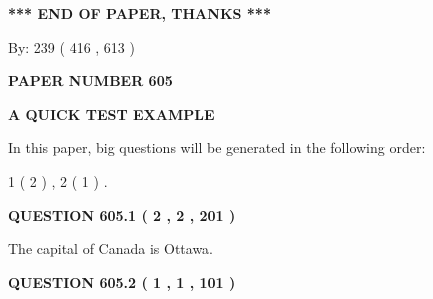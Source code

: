 \documentclass[12pt]{article}
\begin{document}
 
   
   
 \vspace{0.2in}
 
   
   
   
   
\vspace{1.0in} 
{\textbf{\large{ *** END OF PAPER, THANKS *** }}} 
   
   
\hspace{1.0in} By: 
 239 ( 416 ,  613 )
   
   
   
   
\newpage 
\setcounter{page}{ 
   605001 } 
   
   
   
   
 {\textbf{ \Large{ PAPER NUMBER  605  }}}
   
   
\vspace{0.2in}
   
   
   
   
   
   
 \vspace{0.2in}
{\LARGE {\textbf{ A QUICK TEST EXAMPLE}}}
   
   
   
\vspace{0.2in}
   
In this paper, big questions will be generated in the following order: 
   
   
   1 ( 2 )
 ,
   2 ( 1 )
 .
  
\vspace{0.2in}
  
{\textbf{\Large{QUESTION
605.1 
 ( 2 , 2 , 201 )
}}}
  
  
 
 
\noindent{}
 
 
The capital of Canada is Ottawa.
 
 
 
 
  
\vspace{0.2in}
  
{\textbf{\Large{QUESTION
605.2 
 ( 1 , 1 , 101 )
}}}
  
  
 
 
\noindent{}
\end{document}
